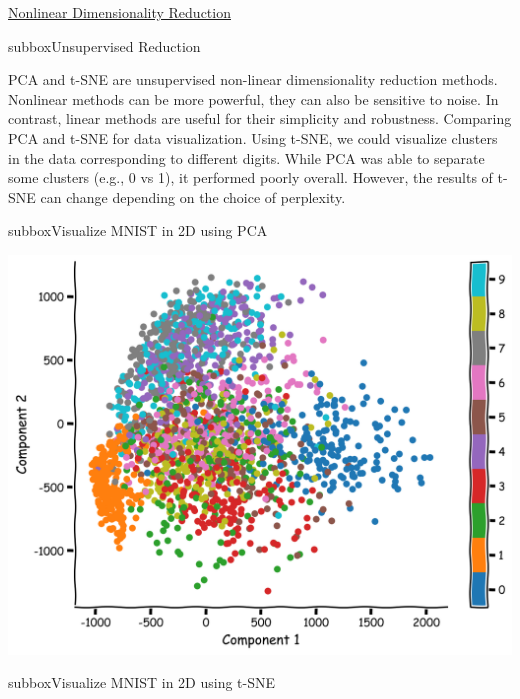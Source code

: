 \begin{textbox}{\href{https://compneuro.neuromatch.io/tutorials/W1D4_DimensionalityReduction/student/W1D4_Tutorial4.html}{ Nonlinear Dimensionality Reduction } }
\begin{subbox}{subbox}{Unsupervised Reduction}
\scriptsize

PCA and t-SNE are unsupervised non-linear dimensionality  reduction methods.
Nonlinear methods can be more powerful, they can also be sensitive to noise. In contrast, linear methods are useful for their simplicity and robustness.
Comparing PCA and t-SNE for data visualization. Using t-SNE, we could visualize clusters in the data corresponding to different digits. While PCA was able to separate some clusters (e.g., 0 vs 1), it performed poorly overall.
However, the results of t-SNE can change depending on the choice of perplexity.

\end{subbox}
\begin{subbox}{subbox}{Visualize MNIST in 2D using PCA}
\scriptsize

\centering
\includegraphics[scale=0.15]{Figures/DM/DMFigure5.png}

\end{subbox}
\begin{subbox}{subbox}{Visualize MNIST in 2D using t-SNE}
\scriptsize


\end{subbox}
\end{textbox}
